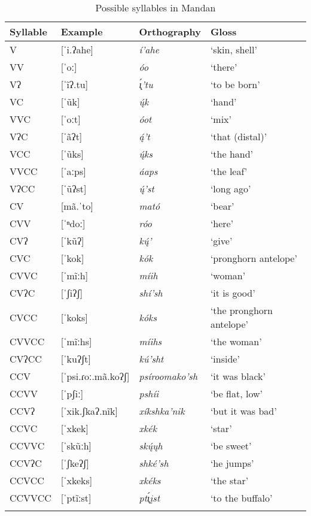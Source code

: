 \begin{table}[t]
\singlespacing
\caption{Possible syllables in Mandan}\label{mandansyllable3}

\begin{tabular}{llll}
\lsptoprule
\textbf{Syllable}&
	\textbf{Example}&
	\textbf{Orthography}&
	\textbf{Gloss}\\
\midrule
V&
	[ˈi.ʔahe]&
	\textit{í'ahe}&
	`skin, shell'\\
VV&
	[ˈoː]&
	\textit{óo}&
	`there'\\
Vʔ&
	[ˈĩʔ.tu]&
	\textit{\'{ı̨}'tu}&
	`to be born'\\
VC&
	[ˈũk]&
	\textit{ų́k}&
	`hand'\\
VVC&
	[ˈoːt]&
	\textit{óot}&
	`mix'\\
VʔC&
	[ˈãʔt]&
	\textit{ą́'t}&
	`that (distal)'\\
VCC&
	[ˈũks]&
	\textit{ų́ks}&
	`the hand'\\
VVCC&
	[ˈaːps]&
	\textit{áaps}&
	`the leaf'\\
VʔCC&
	[ˈũʔst]&
	\textit{ų́'st}&
	`long ago'\\
\midrule
CV&
	[mã.ˈto]&
	\textit{mató}&
	`bear'\\
CVV&
	[ˈⁿdoː]&
	\textit{róo}&
	`here'\\
CVʔ&
	[ˈkũʔ]&
	\textit{kų́'}&
	`give'\\
CVC&
	[ˈkok]&
	\textit{kók}&
	`pronghorn antelope'\\
CVVC&
	[ˈmĩːh]&
	\textit{míih}&
	`woman'\\
CVʔC&
	[ˈʃiʔʃ]&
	\textit{shí'sh}&
	`it is good'\\
CVCC&
	[ˈkoks]&
	\textit{kóks}&
	`the pronghorn antelope'\\
CVVCC&
	[ˈmĩːhs]&
	\textit{míihs}&
	`the woman'\\
CVʔCC&
	[ˈkuʔʃt]&
	\textit{kú'sht}&
	`inside'\\
\midrule
CCV&
	[ˈpsi.ɾoː.mã.koʔʃ]&
	\textit{psíroomako'sh}&
	`it was black'\\
CCVV&
	[ˈpʃiː]&
	\textit{pshíi}&
	`be flat, low'\\
CCVʔ&
	[ˈxik.ʃkaʔ.nĩk]&
	\textit{xíkshka'nik}&
	`but it was bad'\\
CCVC&
	[ˈxkek]&
	\textit{xkék}&
	`star'\\
CCVVC&
	[ˈskũːh]&
	\textit{skų́ųh}&
	`be sweet'\\
CCVʔC&
	[ˈʃkeʔʃ]&
	\textit{shké'sh}&
	`he jumps'\\
CCVCC&
	[ˈxkeks]&
	\textit{xkéks}&
	`the star'\\
CCVVCC&
	[ˈptĩːst]&
	\textit{pt\'{ı̨}įst}&
	`to the buffalo'\\
\lspbottomrule
\end{tabular}
\end{table}

